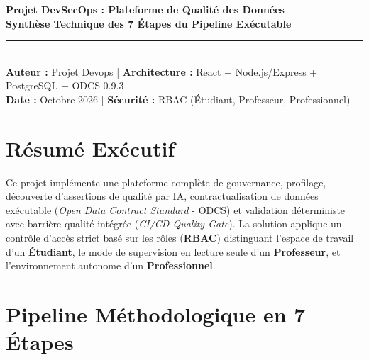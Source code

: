 \documentclass[11pt,a4paper]{article}
\begin{document}
\begin{center}
    {\Huge \bfseries \color{primary} Projet DevSecOps : Plateforme de Qualité des Données}\\[6pt]
    {\Large \bfseries Synthèse Technique des 7 Étapes du Pipeline Exécutable}\\[10pt]
    \rule{\linewidth}{1pt}\\[6pt]
    \textbf{Auteur :} Projet Devops \quad | \quad \textbf{Architecture :} React + Node.js/Express + PostgreSQL + ODCS 0.9.3\\[4pt]
    \textbf{Date :} Octobre 2026 \quad | \quad \textbf{Sécurité :} RBAC (Étudiant, Professeur, Professionnel)
\end{center}

\vspace{10pt}

\section*{Résumé Exécutif}
Ce projet implémente une plateforme complète de gouvernance, profilage, découverte d'assertions de qualité par IA, contractualisation de données exécutable (\textit{Open Data Contract Standard} - ODCS) et validation déterministe avec barrière qualité intégrée (\textit{CI/CD Quality Gate}). La solution applique un contrôle d'accès strict basé sur les rôles (\textbf{RBAC}) distinguant l'espace de travail d'un \textbf{Étudiant}, le mode de supervision en lecture seule d'un \textbf{Professeur}, et l'environnement autonome d'un \textbf{Professionnel}.

\vspace{5pt}

\section*{Pipeline Méthodologique en 7 Étapes}

\begin{center}
\end{center}
\end{document}
